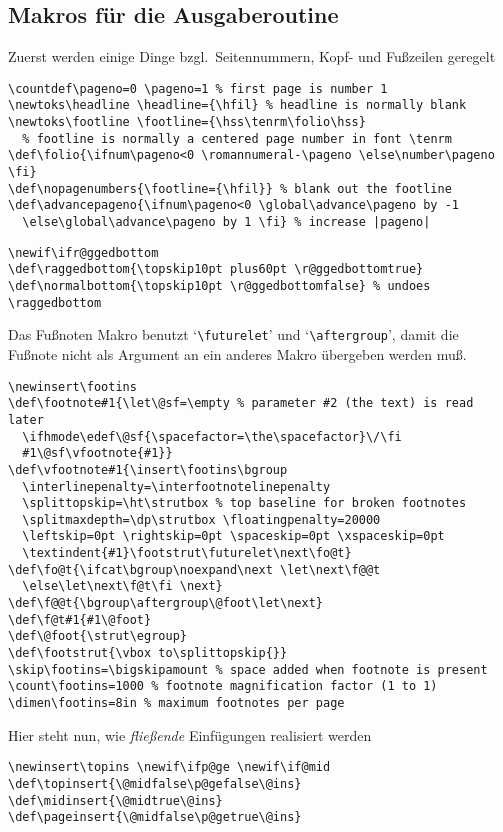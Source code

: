 \begin{appendix}
\subsection{Makros f\"ur die Ausgaberoutine}
Zuerst werden einige Dinge bzgl.\ Seitennummern, Kopf- und Fu\ss{}zeilen
geregelt
\begin{verbatim}
\countdef\pageno=0 \pageno=1 % first page is number 1
\newtoks\headline \headline={\hfil} % headline is normally blank
\newtoks\footline \footline={\hss\tenrm\folio\hss}
  % footline is normally a centered page number in font \tenrm
\def\folio{\ifnum\pageno<0 \romannumeral-\pageno \else\number\pageno \fi}
\def\nopagenumbers{\footline={\hfil}} % blank out the footline
\def\advancepageno{\ifnum\pageno<0 \global\advance\pageno by -1
  \else\global\advance\pageno by 1 \fi} % increase |pageno|
\end{verbatim}
\begin{verbatim}
\newif\ifr@ggedbottom
\def\raggedbottom{\topskip10pt plus60pt \r@ggedbottomtrue}
\def\normalbottom{\topskip10pt \r@ggedbottomfalse} % undoes \raggedbottom
\end{verbatim}
Das Fu\ss{}noten Makro benutzt
`\verb|\futurelet|' und `\verb|\aftergroup|', damit die Fu\ss{}note nicht
als Argument an ein anderes Makro \"ubergeben werden mu\ss{}.
\begin{verbatim}
\newinsert\footins
\def\footnote#1{\let\@sf=\empty % parameter #2 (the text) is read later
  \ifhmode\edef\@sf{\spacefactor=\the\spacefactor}\/\fi
  #1\@sf\vfootnote{#1}}
\def\vfootnote#1{\insert\footins\bgroup
  \interlinepenalty=\interfootnotelinepenalty
  \splittopskip=\ht\strutbox % top baseline for broken footnotes
  \splitmaxdepth=\dp\strutbox \floatingpenalty=20000
  \leftskip=0pt \rightskip=0pt \spaceskip=0pt \xspaceskip=0pt
  \textindent{#1}\footstrut\futurelet\next\fo@t}
\def\fo@t{\ifcat\bgroup\noexpand\next \let\next\f@@t
  \else\let\next\f@t\fi \next}
\def\f@@t{\bgroup\aftergroup\@foot\let\next}
\def\f@t#1{#1\@foot}
\def\@foot{\strut\egroup}
\def\footstrut{\vbox to\splittopskip{}}
\skip\footins=\bigskipamount % space added when footnote is present
\count\footins=1000 % footnote magnification factor (1 to 1)
\dimen\footins=8in % maximum footnotes per page
\end{verbatim}
Hier steht nun, wie {\em flie\ss{}ende} Einf\"ugungen realisiert werden
\begin{verbatim}
\newinsert\topins \newif\ifp@ge \newif\if@mid
\def\topinsert{\@midfalse\p@gefalse\@ins}
\def\midinsert{\@midtrue\@ins}
\def\pageinsert{\@midfalse\p@getrue\@ins}

\end{verbatim}
\end{appendix}

